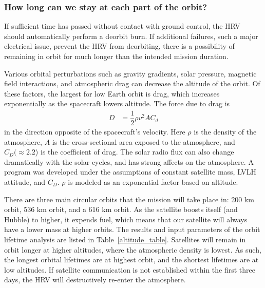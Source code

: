 \documentclass[paper=letter, fontsize=11pt]{scrartcl} %
\numberwithin{equation}{section} %
\numberwithin{figure}{section} %
\numberwithin{table}{section} %
\begin{document}
\subsubsection{How long can we stay at each part of the orbit?} \label{howlong}

If sufficient time has passed without contact with ground control, the HRV should automatically perform a deorbit burn. If additional failures, such a major electrical issue, prevent the HRV from deorbiting, there is a possibility of remaining in orbit for much longer than the intended mission duration.

Various orbital perturbations such as gravity gradients, solar pressure, magnetic field interactions, and atmospheric drag can decrease the altitude of the orbit. Of these factors, the largest for low Earth orbit is drag, which increases exponentially as the spacecraft lowers altitude. The force due to drag is
\begin{align*}
D &= \dfrac{1}{2} \rho v^2 A C_d
\end{align*}
in the direction opposite of the spacecraft's velocity. Here $\rho$ is the density of the atmosphere, $A$ is the cross-sectional area exposed to the atmosphere, and $C_D (\approx 2.2$) is the coefficient of drag. The solar radio flux can also change dramatically with the solar cycles, and has strong affects on the atmosphere. A program was developed under the assumptions of constant satellite mass, LVLH attitude, and $C_D$. $\rho$ is modeled as an exponential factor based on altitude.

There are three main circular orbits that the mission will take place in: 200 km orbit, 536 km orbit, and a 616 km orbit. As the satellite boosts itself (and Hubble) to higher, it expends fuel, which means that our satellite will always have a lower mass at higher orbits. The results and input parameters of the orbit lifetime analysis are listed in Table~\ref{altitude_table}. Satellites will remain in orbit longer at higher altitudes, where the atmospheric density is lowest. As such, the longest orbital lifetimes are at highest orbit, and the shortest lifetimes are at low altitudes. If satellite communication is not established within the first three days, the HRV will destructively re-enter the atmosphere.

\end{document}
